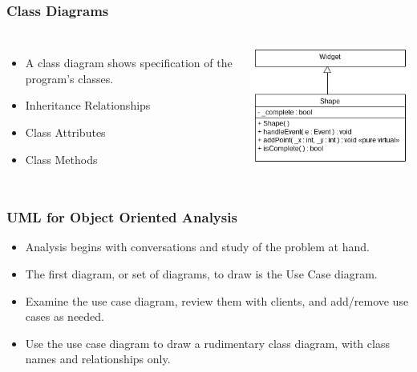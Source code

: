 \documentclass{beamer}
\begin{document}
\begin{frame}
    \frametitle{Class Diagrams}
    \begin{columns}
    \begin{itemize}[<+->]
        \item A class diagram shows specification of the program's classes.
        \item Inheritance Relationships
        \item Class Attributes
        \item Class Methods
    \end{itemize}
    \includegraphics[width=\textwidth]{images/shapeClass}
    \end{columns}
\end{frame}

\begin{frame}
    \frametitle{UML for Object Oriented Analysis}
    \begin{itemize}[<+->]
        \item Analysis begins with conversations and study of the problem at hand.
        \item The first diagram, or set of diagrams, to draw is the Use Case diagram.
        \item Examine the use case diagram, review them with clients, and add/remove 
            use cases as needed.
        \item Use the use case diagram to draw a rudimentary class diagram, with 
            class names and relationships only.
    \end{itemize}
\end{frame}
\end{document}
